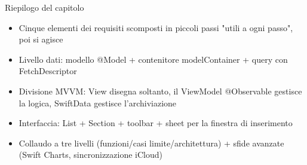 \begin{tcbsummary}{Riepilogo del capitolo}
\begin{itemize}
  \item Cinque elementi dei requisiti scomposti in piccoli passi "utili a ogni passo", poi si agisce
  \item Livello dati: modello @Model + contenitore modelContainer + query con FetchDescriptor
  \item Divisione MVVM: View disegna soltanto, il ViewModel @Observable gestisce la logica, SwiftData gestisce l'archiviazione
  \item Interfaccia: List + Section + toolbar + sheet per la finestra di inserimento
  \item Collaudo a tre livelli (funzioni/casi limite/architettura) + sfide avanzate (Swift Charts, sincronizzazione iCloud)
\end{itemize}

\end{tcbsummary}
